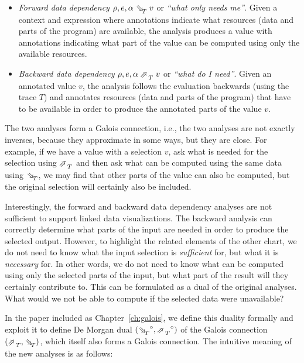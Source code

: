 \documentclass[fleqn,11pt]{report}
\theoremstyle{definition}
\newenvironment{nitemize}
{ \vspace{-0.4em}
  \begin{itemize}
    \setlength{\itemsep}{5pt}
    \setlength{\parskip}{0pt}
    \setlength{\parsep}{0pt} }
{ \end{itemize}
  \vspace{-0.4em} }
\begin{document}
\begin{nitemize}
\item \emph{Forward data dependency} $\rho, e, \alpha\; \evalFwdR{T}\; v$ or \emph{``what only needs me''}.
  Given a context and expression where annotations indicate what resources (data and parts of
  the program) are available, the analysis produces a value with annotations indicating what
  part of the value can be computed using only the available resources.
\item\emph{Backward data dependency} $\rho, e, \alpha\; \evalBwdR{T}\; v$ or \emph{``what do I need''}.
  Given an annotated value $v$, the analysis follows the evaluation backwards (using the trace
  $T$) and annotates resources (data and parts of the program) that have to be available in
  order to produce the annotated parts of the value $v$.
\end{nitemize}

The two analyses form a Galois connection, i.e., the two analyses are not exactly inverses,
because they approximate in some ways, but they are close. For example, if we have a value with
a selection $v$, ask what is needed for the selection using $\evalBwdR{T}$ and then ask
what can be computed using the same data using $\evalFwdR{T}$, we may find that other parts of
the value can also be computed, but the original selection will certainly also be included.

Interestingly, the forward and backward data dependency analyses are not sufficient to
support linked data visualizations. The backward analysis can correctly determine what parts of
the input are needed in order to produce the selected output. However, to highlight the related
elements of the other chart, we do not need to know what the input selection is \emph{sufficient}
for, but what it is \emph{necessary} for. In other words, we do not need to know what can be
computed using only the selected parts of the input, but what part of the result will they
certainly contribute to. This can be formulated as a dual of the original analyses. What would we
not be able to compute if the selected data were unavailable?

In the paper included as Chapter~\ref{ch:galois}, we define this duality formally and exploit
it to define De Morgan dual $(\dual{\evalFwdR{T}}, \dual{\evalBwdR{T}})$ of the Galois
connection $(\evalBwdR{T}, \evalFwdR{T})$, which itself also forms a Galois connection.
The intuitive meaning of the new analyses is as follows:
\end{document}
